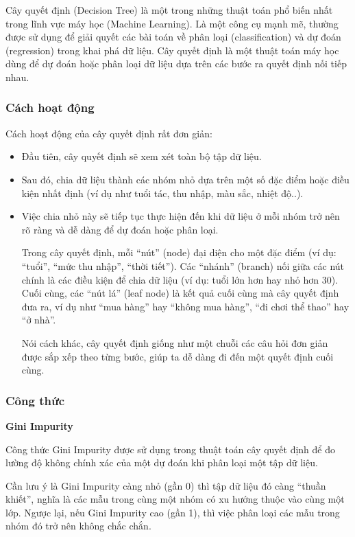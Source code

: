 \documentclass[
]{article}
\begin{document}
Cây quyết định (Decision Tree) là một trong những thuật toán phổ biến
nhất trong lĩnh vực máy học (Machine Learning). Là một công cụ mạnh mẽ,
thường được sử dụng để giải quyết các bài toán về phân loại
(classification) và dự đoán (regression) trong khai phá dữ liệu. Cây
quyết định là một thuật toán máy học dùng để dự đoán hoặc phân loại dữ
liệu dựa trên các bước ra quyết định nối tiếp nhau.

\subsubsection{Cách hoạt động}\label{cuxe1ch-houx1ea1t-ux111ux1ed9ng-1}

Cách hoạt động của cây quyết định rất đơn giản:

\begin{itemize}
\item
  Đầu tiên, cây quyết định sẽ xem xét toàn bộ tập dữ liệu.
\item
  Sau đó, chia dữ liệu thành các nhóm nhỏ dựa trên một số đặc điểm hoặc
  điều kiện nhất định (ví dụ như tuổi tác, thu nhập, màu sắc, nhiệt
  độ..).
\item
  Việc chia nhỏ này sẽ tiếp tục thực hiện đến khi dữ liệu ở mỗi nhóm trở
  nên rõ ràng và dễ dàng để dự đoán hoặc phân loại.

  Trong cây quyết định, mỗi ``nút'' (node) đại diện cho một đặc điểm (ví
  dụ: ``tuổi'', ``mức thu nhập'', ``thời tiết''). Các ``nhánh'' (branch)
  nối giữa các nút chính là các điều kiện để chia dữ liệu (ví dụ: tuổi
  lớn hơn hay nhỏ hơn 30). Cuối cùng, các ``nút lá'' (leaf node) là kết
  quả cuối cùng mà cây quyết định đưa ra, ví dụ như ``mua hàng'' hay
  ``không mua hàng'', ``đi chơi thể thao'' hay ``ở nhà''.

  Nói cách khác, cây quyết định giống như một chuỗi các câu hỏi đơn giản
  được sắp xếp theo từng bước, giúp ta dễ dàng đi đến một quyết định
  cuối cùng.
\end{itemize}

\subsubsection{Công thức}\label{cuxf4ng-thux1ee9c}

\textbf{Gini Impurity}

Công thức Gini Impurity được sử dụng trong thuật toán cây quyết định để
đo lường độ không chính xác của một dự đoán khi phân loại một tập dữ
liệu.

Cần lưu ý là Gini Impurity càng nhỏ (gần 0) thì tập dữ liệu đó càng
``thuần khiết'', nghĩa là các mẫu trong cùng một nhóm có xu hướng thuộc
vào cùng một lớp. Ngược lại, nếu Gini Impurity cao (gần 1), thì việc
phân loại các mẫu trong nhóm đó trở nên không chắc chắn.
\end{document}

